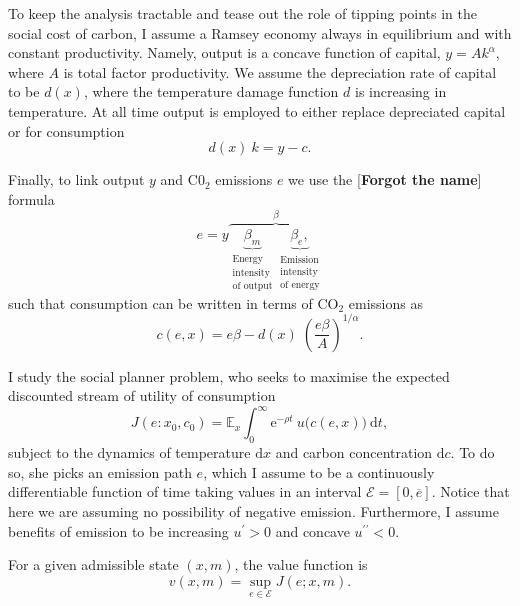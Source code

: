 \documentclass[../../main.tex]{subfiles}
\begin{document}
To keep the analysis tractable and tease out the role of tipping points in the social cost of carbon, I assume a Ramsey economy always in equilibrium and with constant productivity. Namely, output is a concave function of capital, $y = A k^\alpha$, where $A$ is total factor productivity. We assume the depreciation rate of capital to be $d(x)$, where the temperature damage function $d$ is increasing in temperature. At all time output is employed to either replace depreciated capital or for consumption \begin{equation}
    d(x) \ k = y - c.
\end{equation}

Finally, to link output $y$ and C0$_2$ emissions $e$ we use the [\textbf{Forgot the name}] formula \begin{equation}
    e = y \overbrace{\underbrace{\beta_m}_{\substack{\text{Energy} \\ \text{intensity} \\ \text{of output}}} \underbrace{\beta_e,}_{\substack{\text{Emission} \\ \text{intensity} \\ \text{of energy}}}}^{\beta}
\end{equation} such that consumption can be written in terms of CO$_2$ emissions as \begin{equation}
    c(e, x) = e \beta - d(x) \; \left(\frac{e \beta}{A}\right)^{1 / \alpha}. 
\end{equation}

I study the social planner problem, who seeks to maximise the expected discounted stream of utility of consumption \begin{equation}
    J(e \colon x_0, c_0) = \mathbb{E}_{x} \int^{\infty}_0 \mathrm{e}^{-\rho t} \ u\Big(c(e, x)\Big) \ \text{d} t,
\end{equation} subject to the dynamics of temperature $\text{d}x$ and carbon concentration $\text{d}c$. To do so, she picks an emission path $e$, which I assume to be a continuously differentiable function of time taking values in an interval $\mathcal{E} = [0, \overline{e}]$. Notice that here we are assuming no possibility of negative emission. Furthermore, I assume benefits of emission to be increasing $u^\prime > 0$ and concave $u^{\prime \prime} < 0$. 

For a given admissible state $(x, m)$, the value function is \begin{equation}
    v(x, m) = \sup_{e \in \mathcal{E}} J(e; x, m).
\end{equation} 
\end{document}
